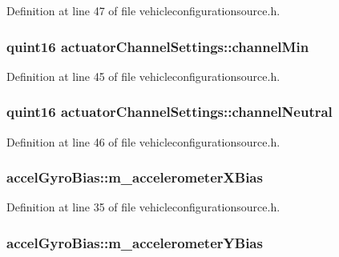 Definition at line 47 of file vehicleconfigurationsource.\-h.

\hypertarget{group___vehicle_configuration_source_ga51bfc85e00becd45e4e622da70ff9d27}{
\subsubsection[{channel\-Min}]{\setlength{\rightskip}{0pt plus 5cm}quint16 actuator\-Channel\-Settings\-::channel\-Min}}\label{group___vehicle_configuration_source_ga51bfc85e00becd45e4e622da70ff9d27}


Definition at line 45 of file vehicleconfigurationsource.\-h.

\hypertarget{group___vehicle_configuration_source_gac557d0adca6e1ec8f789659c32cfbeff}{
\subsubsection[{channel\-Neutral}]{\setlength{\rightskip}{0pt plus 5cm}quint16 actuator\-Channel\-Settings\-::channel\-Neutral}}\label{group___vehicle_configuration_source_gac557d0adca6e1ec8f789659c32cfbeff}


Definition at line 46 of file vehicleconfigurationsource.\-h.

\hypertarget{group___vehicle_configuration_source_ga982c33b20f567fe289dd461ce9bb0df2}{
\subsubsection[{m\-\_\-accelerometer\-X\-Bias}]{ accel\-Gyro\-Bias\-::m\-\_\-accelerometer\-X\-Bias}}\label{group___vehicle_configuration_source_ga982c33b20f567fe289dd461ce9bb0df2}


Definition at line 35 of file vehicleconfigurationsource.\-h.

\hypertarget{group___vehicle_configuration_source_ga76b3af5f8c4f87a92045a698eb32c681}{
\subsubsection[{m\-\_\-accelerometer\-Y\-Bias}]{ accel\-Gyro\-Bias\-::m\-\_\-accelerometer\-Y\-Bias}}\label{group___vehicle_configuration_source_ga76b3af5f8c4f87a92045a698eb32c681}


